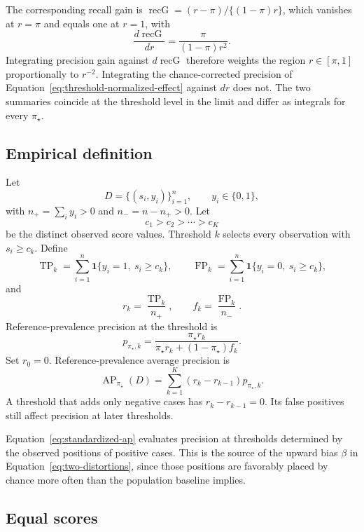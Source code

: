 \documentclass[11pt]{article}
\newcommand{\AP}{\operatorname{AP}}
\theoremstyle{remark}
\begin{document}
The corresponding recall gain is $\operatorname{recG}=(r-\pi)/\{(1-\pi)r\}$, which vanishes at $r=\pi$ and equals one at $r=1$, with
\[
\frac{d\operatorname{recG}}{dr}
=
\frac{\pi}{(1-\pi)r^{2}} .
\]
Integrating precision gain against $d\operatorname{recG}$ therefore weights the region $r\in[\pi,1]$ proportionally to $r^{-2}$. Integrating the chance-corrected precision of Equation~\eqref{eq:threshold-normalized-effect} against $dr$ does not. The two summaries coincide at the threshold level in the limit and differ as integrals for every $\pi_\star$.

\subsection{Empirical definition}

Let
\[
D=\{(s_i,y_i)\}_{i=1}^{n},
\qquad y_i\in\{0,1\},
\]
with $n_+=\sum_i y_i>0$ and $n_-=n-n_+>0$. Let
\[
c_1>c_2>\cdots>c_K
\]
be the distinct observed score values. Threshold $k$ selects every observation with $s_i\geq c_k$. Define
\[
\operatorname{TP}_k
=
\sum_{i=1}^{n}\mathbf{1}\{y_i=1,\ s_i\geq c_k\},
\qquad
\operatorname{FP}_k
=
\sum_{i=1}^{n}\mathbf{1}\{y_i=0,\ s_i\geq c_k\},
\]
and
\[
r_k=\frac{\operatorname{TP}_k}{n_+},
\qquad
f_k=\frac{\operatorname{FP}_k}{n_-}.
\]
Reference-prevalence precision at the threshold is
\begin{equation}
p_{\pi_\star,k}
=
\frac{\pi_\star r_k}
{\pi_\star r_k+(1-\pi_\star)f_k}.
\label{eq:empirical-reference-precision}
\end{equation}
Set $r_0=0$. Reference-prevalence average precision is
\begin{equation}
\AP_{\pi_\star}(D)
=
\sum_{k=1}^{K}
(r_k-r_{k-1})p_{\pi_\star,k}.
\label{eq:standardized-ap}
\end{equation}
A threshold that adds only negative cases has $r_k-r_{k-1}=0$. Its false positives still affect precision at later thresholds.

Equation~\eqref{eq:standardized-ap} evaluates precision at thresholds determined by the observed positions of positive cases. This is the source of the upward bias $\beta$ in Equation~\eqref{eq:two-distortions}, since those positions are favorably placed by chance more often than the population baseline implies.

\subsection{Equal scores}
\end{document}
